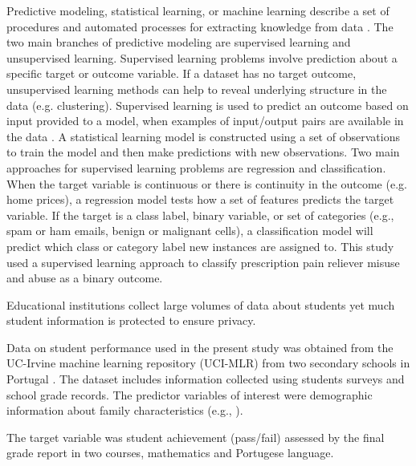 \documentclass[sigconf]{acmart}
\begin{document}
Predictive modeling, statistical learning, or machine learning describe a 
set of procedures and automated processes for extracting knowledge from 
data \cite{james13, kuhn13, muller17, raschka17}. The two main branches 
of predictive modeling are supervised learning and unsupervised learning. 
Supervised learning problems involve prediction about a specific target 
or outcome variable. If a dataset has no target outcome, unsupervised 
learning methods can help to reveal underlying structure in the data 
(e.g. clustering). Supervised learning is used to predict an outcome based 
on input provided to a model, when examples of input/output pairs are 
available in the data \cite{muller17}. A statistical learning model is 
constructed using a set of observations to train the model and then make
predictions with new observations. Two main approaches for supervised learning 
problems are regression and classification. When the target variable
is continuous or there is continuity in the outcome (e.g. home prices), a 
regression model tests how a set of features predicts the target variable. 
If the target is a class label, binary variable, or set of categories 
(e.g., spam or ham emails, benign or malignant cells), a classification model 
will predict which class or category label new instances are assigned to. 
This study used a supervised learning approach to classify prescription pain
reliever misuse and abuse as a binary outcome. 


Educational institutions collect large volumes of data about students yet 
much student information is protected to ensure privacy. 

Data on student performance used in the present study was obtained from the
UC-Irvine machine learning repository (UCI-MLR) from two secondary schools 
in Portugal \cite{cortez09}. The dataset includes information collected using
students surveys and school grade records. The predictor variables of interest
were demographic information about family characteristics (e.g., ).

The target variable was student achievement (pass/fail) assessed by the 
final grade report in two courses, mathematics and Portugese language. 



\end{document}
